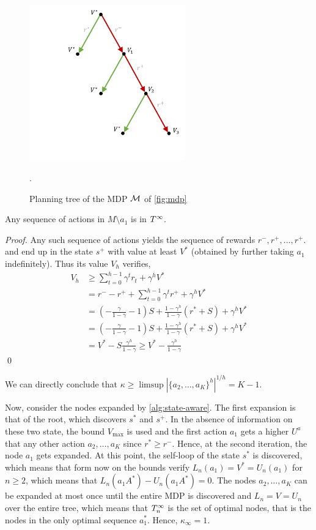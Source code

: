 \documentclass[runningheads]{llncs}
\begin{document}
\begin{figure}
    \centering
    \includegraphics[trim={3.5cm 2cm 0.5cm 0.5cm}, clip, width=0.6\textwidth]{img/mdp_tree.pdf}
    \caption{Planning tree of the MDP $\mathcal{M}$ of \autoref{fig:mdp}}.
    \label{fig:mdp-tree}
\end{figure}
\begin{lemma}
 Any sequence of actions in $M\setminus{a_1}$ is in $T^\infty$.
\end{lemma}
\begin{proof}
Any such sequence of actions yields the sequence of rewards $r^-, r^+, \dots,r^+$. and end up in the state $s^+$ with value at least $V^*$ (obtained by further taking $a_1$ indefinitely). Thus its value $V_h$ verifies, 
\begin{align*}
    V_h &\geq \sum_{t=0}^{h-1} \gamma^t r_t + \gamma^h V^*\\
    &= r^- - r^+ + \sum_{t=0}^{h-1} \gamma^t r^+ + \gamma^h V^* \\
    &= (-\frac{\gamma}{1-\gamma} - 1)S + \frac{1-\gamma^h}{1-\gamma} (r^* + S) + \gamma^h V^*\\
    &= (-\frac{\gamma}{1-\gamma} - 1)S + \frac{1-\gamma^h}{1-\gamma} (r^* + S) + \gamma^h V^*\\
    &= V^* - S\frac{\gamma^h}{1-\gamma} \geq V^* - \frac{\gamma^h}{1-\gamma}
\end{align*}
\qed\end{proof}

We can directly conclude that $\kappa \geq \limsup{|\{a_2,\dots,a_K\}^h|^{1/h}} = K-1$.

Now, consider the nodes expanded by \autoref{alg:state-aware}. The first expansion is that of the root, which discovers $s^*$ and $s^+$. In the absence of information on these two state, the bound $V_{\max}$ is used and the first action $a_1$ gets a higher $U^a$ that any other action $a_2,\dots,a_K$ since $r^* \geq r^-$. Hence, at the second iteration, the node $a_1$ gets expanded. At this point, the self-loop of the state $s^*$ is discovered, which means that form now on the bounds verify $L_n(a_1) = V^* = U_n(a_1)$ for $n\geq2$, which means that $L_n(a_1A^*)-U_n(a_1A^*) = 0$. The nodes $a_2,\dots,a_K$ can be expanded at most once until the entire MDP is discovered and $L_n=V=U_n$ over the entire tree, which means that $T_n^\infty$ is the set of optimal nodes, that is the nodes in the only optimal sequence $a_1^*$. Hence, $\kappa_\infty = 1.$ 
\end{document}
